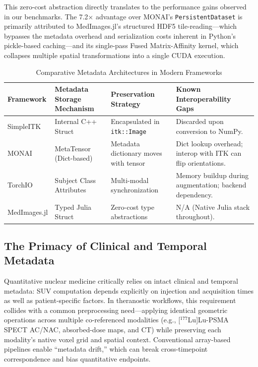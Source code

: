 \documentclass[10pt,letterpaper]{article}
\begin{document}
This zero-cost abstraction directly translates to the performance gains observed in our benchmarks. The 7.2$\times$ advantage over MONAI's \texttt{PersistentDataset} is primarily attributed to MedImages.jl's structured HDF5 tile-reading---which bypasses the metadata overhead and serialization costs inherent in Python's pickle-based caching---and its single-pass Fused Matrix-Affinity kernel, which collapses multiple spatial transformations into a single CUDA execution. 

\begin{table}[H]
\centering
\caption{Comparative Metadata Architectures in Modern Frameworks}
\begin{tabular}{|p{2.5cm}|p{3.5cm}|p{3.5cm}|p{3.5cm}|}
\hline
\textbf{Framework} & \textbf{Metadata Storage Mechanism} & \textbf{Preservation Strategy} & \textbf{Known Interoperability Gaps} \\
\hline
SimpleITK & Internal C++ Struct & Encapsulated in \texttt{itk::Image} & Discarded upon conversion to NumPy. \\
\hline
MONAI & MetaTensor (Dict-based) & Metadata dictionary moves with tensor & Dict lookup overhead; interop with ITK can flip orientations. \\
\hline
TorchIO & Subject Class Attributes & Multi-modal synchronization & Memory buildup during augmentation; backend dependency. \\
\hline
MedImages.jl & Typed Julia Struct & Zero-cost type abstractions & N/A (Native Julia stack throughout). \\
\hline
\end{tabular}
\label{tab:metadata_comparison}
\end{table}

\subsection*{The Primacy of Clinical and Temporal Metadata}
Quantitative nuclear medicine critically relies on intact clinical and temporal metadata: SUV computation depends explicitly on injection and acquisition times as well as patient-specific factors. In theranostic workflows, this requirement collides with a common preprocessing need---applying identical geometric operations across multiple co-referenced modalities (e.g., [$^{177}$Lu]Lu-PSMA SPECT AC/NAC, absorbed-dose maps, and CT) while preserving each modality’s native voxel grid and spatial context. Conventional array-based pipelines enable “metadata drift,” which can break cross-timepoint correspondence and bias quantitative endpoints.
\end{document}
